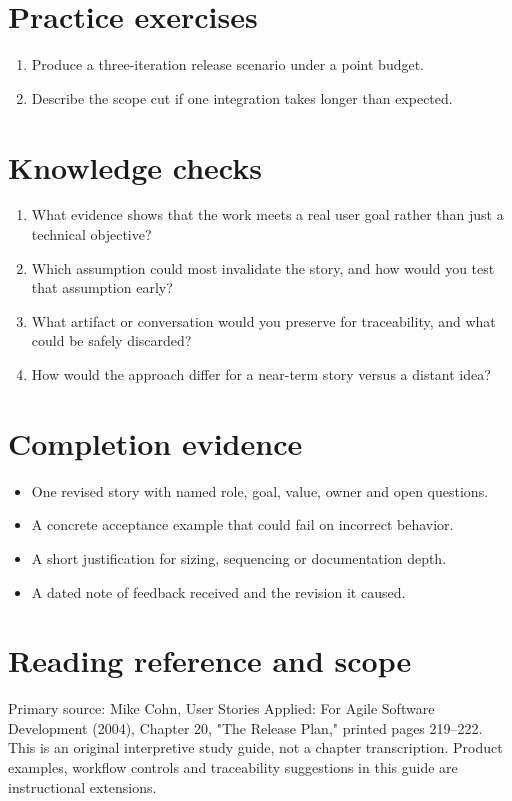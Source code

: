 \documentclass[11pt,letterpaper]{article}
\begin{document}
\section{Practice exercises}
\begin{enumerate}[leftmargin=*,itemsep=3pt]
\item Produce a three-iteration release scenario under a point budget.
\item Describe the scope cut if one integration takes longer than expected.
\end{enumerate}
\section{Knowledge checks}
\begin{enumerate}[leftmargin=*,itemsep=3pt]
\item What evidence shows that the work meets a real user goal rather than just a technical objective?
\item Which assumption could most invalidate the story, and how would you test that assumption early?
\item What artifact or conversation would you preserve for traceability, and what could be safely discarded?
\item How would the approach differ for a near-term story versus a distant idea?
\end{enumerate}
\section{Completion evidence}
\begin{itemize}[leftmargin=*,itemsep=2pt]
\item One revised story with named role, goal, value, owner and open questions.
\item A concrete acceptance example that could fail on incorrect behavior.
\item A short justification for sizing, sequencing or documentation depth.
\item A dated note of feedback received and the revision it caused.
\end{itemize}
\section{Reading reference and scope}
Primary source: Mike Cohn, User Stories Applied: For Agile Software Development (2004), Chapter 20, "The Release Plan," printed pages 219–222. This is an original interpretive study guide, not a chapter transcription. Product examples, workflow controls and traceability suggestions in this guide are instructional extensions.
\end{document}
